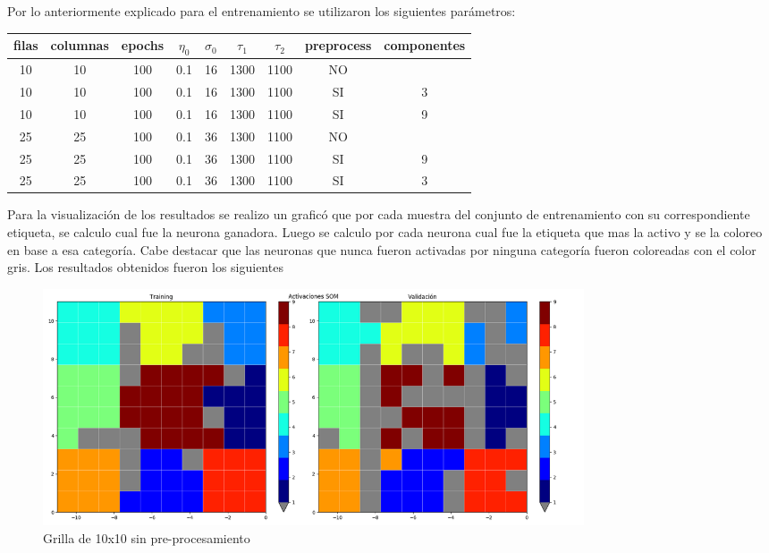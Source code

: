 Por lo anteriormente explicado para el entrenamiento se utilizaron los
siguientes parámetros:
\begin{center}
  \begin{tabular}{|c|c|c|c|c|c|c|c|c|}
    \hline
    filas & columnas & epochs & $\eta_0$ & $\sigma_0$ & $\tau_1$ & $\tau_2$ & preprocess & componentes \\
    \hline
	10 & 10 & 100 & 0.1 & 16 & 1300 & 1100 & NO & \ \\
    \hline
	10 & 10 & 100 & 0.1 & 16 & 1300 & 1100 & SI & 3 \\
    \hline
	10 & 10 & 100 & 0.1 & 16 & 1300 & 1100 & SI & 9 \\
    \hline
	25 & 25 & 100 & 0.1 & 36 & 1300 & 1100 & NO & \  \\
    \hline
	25 & 25 & 100 & 0.1 & 36 & 1300 & 1100 & SI & 9  \\
    \hline
  25 & 25 & 100 & 0.1 & 36 & 1300 & 1100 & SI & 3  \\
    \hline
  \end{tabular}
\end{center}

Para la visualización de los resultados se realizo un graficó que por cada
muestra del conjunto de entrenamiento con su correspondiente etiqueta, se
calculo cual fue la neurona ganadora. Luego se calculo por cada neurona cual
fue la etiqueta que mas la activo y se la coloreo en base a esa categoría. Cabe
destacar que las neuronas que nunca fueron activadas por ninguna categoría
fueron coloreadas con el color gris.  Los resultados obtenidos fueron los
siguientes

\begin{figure}[H]
  \includegraphics[width=160mm]{imagenes/som_10_10.png}
  \caption{Grilla de 10x10 sin pre-procesamiento}
\end{figure}

